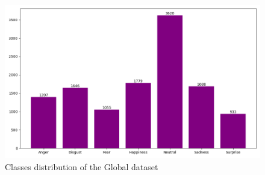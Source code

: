    \begin{figure}[H]
        \centering
        \includegraphics[width=1\columnwidth]{Images/Plot1.png}
        \caption{Classes distribution of the Global dataset}
        \label{Global_distribution}
    \end{figure}
    
  

